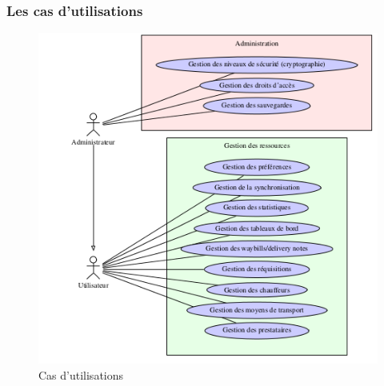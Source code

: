 \begin{frame}
\frametitle{Les cas d'utilisations}
\begin{figure}[htbp]
	\centering
	\includegraphics[scale=0.36]{Images/casutilisation.png}
	\caption{Cas d'utilisations}
	\end{figure}
\end{frame}
